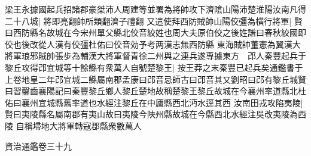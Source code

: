 梁王永據國起兵招諸郡豪桀沛人周建等並署為將帥攻下濟隂山陽沛楚淮陽汝南凡得二十八城|{
	將即亮翻帥所類翻濟子禮翻}
又遣使拜西防賊帥山陽佼彊為横行將軍|{
	賢曰西防縣名故城在今宋州單父縣北佼音絞姓也周大夫原伯佼之後姓譜曰春秋絞國即佼也後改從人漢有佼彊杜佑曰佼音効予考两漢志無西防縣}
東海賊帥董憲為翼漢大將軍琅邪賊帥張步為輔漢大將軍督青徐二州與之連兵遂專據東方　邔人秦豐起兵于黎丘攻得邔宜城等十餘縣有衆萬人自號楚黎王|{
	按王莽之末秦豐已起兵矣通鑑書于上卷地皇二年邔宜城二縣屬南郡孟康曰邔音忌師古曰邔音其又劉昭曰邔有黎丘城賢曰習鑿齒襄陽記曰秦豐黎丘鄉人黎丘楚地故稱楚黎王黎丘故城在今襄州率道縣北杜佑曰襄州宜城縣舊率道也水經注黎丘在中廬縣西北沔水逕其西}
汝南田戎攻陷夷陵|{
	賢曰夷陵縣名屬南郡有夷山故曰夷陵今陜州縣故城在今縣西北水經注吳改夷陵為西陵}
自稱埽地大將軍轉寇郡縣衆數萬人

資治通鑑卷三十九
